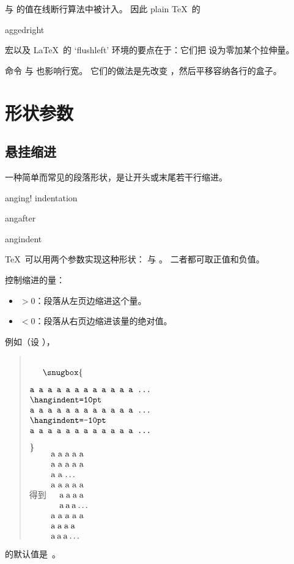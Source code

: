 \documentclass[a4paper]{rapport3}
\makeatletter
\newenvironment{disp}{\begin{quotation}}{\end{quotation}}
\def\term#1\par{\index{#1}}
\def\cstoidx#1\par{\index{#1@\cs{#1}}}
\def\csidx#1{\cstoidx #1\par\cs{#1}}
\makeatother
\begin{document}
 与  的值在线断行算法中被计入。
因此 plain \TeX\ 的 \csidx{raggedright} 宏以及 \LaTeX\ 的 `flushleft'
环境的要点在于：它们把  设为零加某个拉伸量。

命令  与  也影响行宽。
它们的做法是先改变 ，然后平移容纳各行的盒子。

\section{形状参数}

\subsection{悬挂缩进}

一种简单而常见的段落形状，是让开头或末尾若干行缩进。
\term hanging! indentation\par
\cstoidx hangafter\par\cstoidx hangindent\par
\TeX\ 可以用两个参数实现这种形状： 与 。
二者都可取正值和负值。

 控制缩进的量：
\begin{itemize}\item {}${}>0$：段落从左页边缩进这个量。
\item{}${}<0$：段落从右页边缩进该量的绝对值。
\end{itemize}
\def\exnul{\leftskip=0pt \rightskip=0pt \relax}
例如（设 ），
\begin{disp}\leavevmode{}%
\hbox{%
$\vcenter{\snugbox{\begin{verbatim}
 a a a a a a a a a a a a ...

 \hangindent=10pt
 a a a a a a a a a a a a ...

 \hangindent=-10pt
 a a a a a a a a a a a a ...
\end{verbatim}
}}$\quad 得到\quad %
$\vcenter{\parindent0pt \setbox0\hbox{a a a a a}\hsize\wd0
 \leftskip=0pt %
 a a a a a a a a a a a a \dots\par%
 \hangindent=10pt
 a a a a a a a a a a a a \dots\par%
 \hangindent=-10pt
 a a a a a a a a a a a a \dots\par}$
}\end{disp}
 的默认值是~\n{0pt}。
\end{document}
